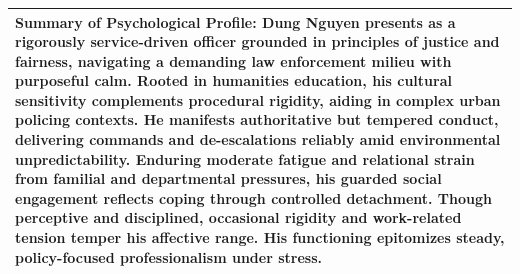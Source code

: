 \documentclass[11pt]{article}
\begin{document}
\begin{table}[ht]
\begin{tabularx}{\textwidth}{@{}X@{}}
\textbf{Summary of Psychological Profile:} Dung Nguyen presents as a rigorously service-driven officer grounded in principles of justice and fairness, navigating a demanding law enforcement milieu with purposeful calm. Rooted in humanities education, his cultural sensitivity complements procedural rigidity, aiding in complex urban policing contexts. He manifests authoritative but tempered conduct, delivering commands and de-escalations reliably amid environmental unpredictability. Enduring moderate fatigue and relational strain from familial and departmental pressures, his guarded social engagement reflects coping through controlled detachment. Though perceptive and disciplined, occasional rigidity and work-related tension temper his affective range. His functioning epitomizes steady, policy-focused professionalism under stress. \\
\bottomrule
\end{tabularx}
\end{table}
\end{document}
